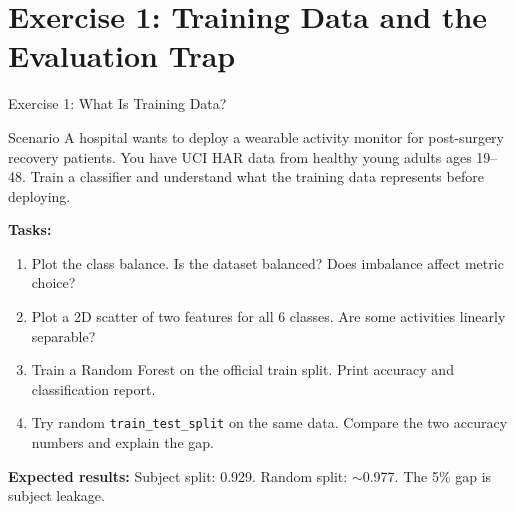 \documentclass[aspectratio=169,11pt]{beamer}
\begin{document}
\section{Exercise 1: Training Data and the Evaluation Trap}

\begin{frame}{Exercise 1: What Is Training Data?}
    \begin{block}{Scenario}
        A hospital wants to deploy a wearable activity monitor for post-surgery recovery patients. You have UCI HAR data from healthy young adults ages 19--48. Train a classifier and understand what the training data represents before deploying.
    \end{block}

    \vspace{0.2cm}
    \textbf{Tasks:}
    \begin{enumerate}
        \item Plot the class balance. Is the dataset balanced? Does imbalance affect metric choice?
        \item Plot a 2D scatter of two features for all 6 classes. Are some activities linearly separable?
        \item Train a Random Forest on the official train split. Print accuracy and classification report.
        \item Try random \texttt{train\_test\_split} on the same data. Compare the two accuracy numbers and explain the gap.
    \end{enumerate}

    \vspace{0.1cm}
    \textbf{Expected results:} Subject split: 0.929. Random split: $\sim$0.977. The 5\% gap is subject leakage.
\end{frame}
\end{document}
